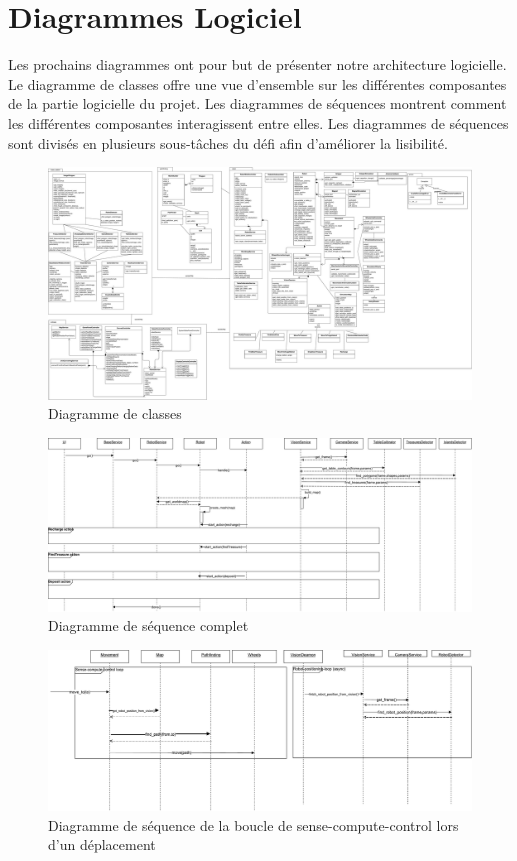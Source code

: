\chapter{Diagrammes Logiciel}
Les prochains diagrammes ont pour but de présenter notre architecture logicielle. Le diagramme de classes offre une vue d'ensemble sur les différentes composantes de la partie logicielle du projet. Les diagrammes de séquences montrent comment les différentes composantes interagissent entre elles. Les diagrammes de séquences sont divisés en plusieurs sous-tâches du défi afin d'améliorer la lisibilité.

\begin{landscape}
\begin{figure}
  \centering
  \includegraphics[scale=0.2, angle=0]{resources/diagrams/classDiagram.pdf}
  \caption{Diagramme de classes}
\end{figure}

\begin{figure}
  \centering
  \includegraphics[scale=0.45, angle=0]{resources/diagrams/sequenceDiagram.pdf}
  \caption{Diagramme de séquence complet}
\end{figure}

\begin{figure}
  \centering
  \includegraphics[scale=0.45, angle=0]{resources/diagrams/robotMovement.pdf}
  \caption{Diagramme de séquence de la boucle de sense-compute-control lors d'un déplacement}
\end{figure}


\end{landscape}
